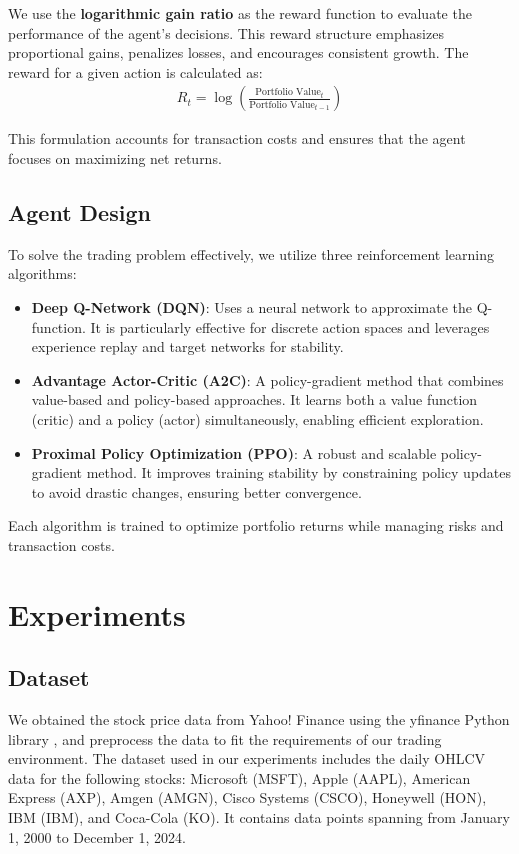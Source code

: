 \documentclass[conference]{IEEEtran}
\begin{document}
We use the \textbf{logarithmic gain ratio} as the reward function to evaluate the performance of the agent's decisions. This reward structure emphasizes proportional gains, penalizes losses, and encourages consistent growth. The reward for a given action is calculated as:
\begin{align*}
  R_t = \log\left(\frac{\text{Portfolio Value}_{t}}{\text{Portfolio Value}_{t-1}}\right)
\end{align*}

This formulation accounts for transaction costs and ensures that the agent focuses on maximizing net returns.

\subsection{Agent Design}

To solve the trading problem effectively, we utilize three reinforcement learning algorithms:

\begin{itemize}
  \item \textbf{Deep Q-Network (DQN)}: Uses a neural network to approximate the Q-function. It is particularly effective for discrete action spaces and leverages experience replay and target networks for stability.
  \item \textbf{Advantage Actor-Critic (A2C)}: A policy-gradient method that combines value-based and policy-based approaches. It learns both a value function (critic) and a policy (actor) simultaneously, enabling efficient exploration.
  \item \textbf{Proximal Policy Optimization (PPO)}: A robust and scalable policy-gradient method. It improves training stability by constraining policy updates to avoid drastic changes, ensuring better convergence.
\end{itemize}

Each algorithm is trained to optimize portfolio returns while managing risks and transaction costs.

\section{Experiments}

\subsection{Dataset}

We obtained the stock price data from Yahoo! Finance \cite{yahoofinance} using the yfinance Python library \cite{yfinance}, and preprocess the data to fit the requirements of our trading environment. The dataset used in our experiments includes the daily OHLCV data for the following stocks: Microsoft (MSFT), Apple (AAPL), American Express (AXP), Amgen (AMGN), Cisco Systems (CSCO), Honeywell (HON), IBM (IBM), and Coca-Cola (KO). It contains data points spanning from January 1, 2000 to December 1, 2024.
\end{document}
